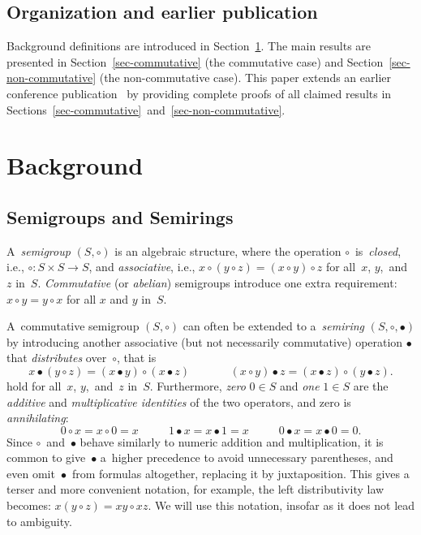 \documentclass{toc}
\begin{document}
\subsection{Organization and earlier publication}

Background definitions are introduced in Section~\ref{sec:background}. The main
results are presented in Section~\ref{sec-commutative} (the commutative case)
and Section~\ref{sec-non-commutative} (the non-commutative case).
This paper extends an earlier conference publication~\cite{isaac-2019-version}
by providing complete proofs of all claimed results in
Sections~\ref{sec-commutative}~and~\ref{sec-non-commutative}.

\section{Background} \label{sec:background}
\subsection{Semigroups and Semirings}
A~\emph{semigroup} $(S, \circ)$ is an algebraic structure, where
the operation
$\circ$~is~\emph{closed}, i.e., $\circ : S\times S \rightarrow S$,
and
\emph{associative}, i.e.,
$x \circ (y \circ z) = (x \circ y) \circ z$ for all~$x$, $y$,~and~$z$
in~$S$.
\emph{Commutative} (or \emph{abelian}) semigroups introduce
one extra requirement: $x \circ y = y \circ x$ for all $x$ and $y$
in~$S$.

A~commutative semigroup $(S, \circ)$ can often be extended to
a~\emph{semiring} $(S, \circ, \bullet)$ by introducing
another associative (but not necessarily
commutative)
operation $\bullet$ that \emph{distributes} over~$\circ$, that is
\[
x \bullet (y \circ z) = (x \bullet y) \circ (x \bullet z)~~~~~~~~~~~~~~~~(x \circ y) \bullet z = (x \bullet z) \circ (y \bullet z).
\]
hold for all~$x$, $y$,~and~$z$ in~$S$.
Furthermore, \emph{zero} $0 \in S$ and \emph{one} $1 \in S$ are the
\emph{additive} and \emph{multiplicative identities} of the two operators,
and zero is \emph{annihilating}:
\[
0 \circ x = x \circ 0=x~~~~~~~~~~~~1 \bullet x = x \bullet 1 = x~~~~~~~~~~~~0 \bullet x = x \bullet 0 = 0.
\]
Since $\circ$~and~$\bullet$ behave
similarly to numeric addition and multiplication, it is common to
give~$\bullet$ a~higher precedence to avoid
unnecessary parentheses, and even omit~$\bullet$~from
formulas altogether, replacing it by juxtaposition.
This gives a terser and more convenient notation, for example, the left
distributivity law becomes: $x (y \circ z) = x y \circ x z$. We will use this
notation, insofar as it does not lead to ambiguity.
\end{document}
